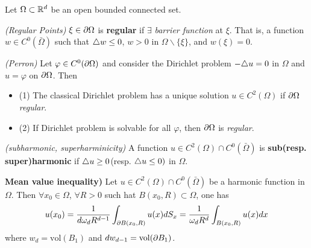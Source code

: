 \documentclass[12pt,a4paper]{article}
\renewenvironment{i}
{\begin{itemize} 
	}%
	{\end{itemize}
}
\begin{document}
Let $\Omega \subset \mathbb{R}^d$ be an open bounded connected set.
\s

 \emph{(Regular Points)} $\xi \in \partial \Omega$ is \textbf{regular} if $\exists$ \emph{barrier function} at $\xi$. That is, a function $w\in C^0 (\bar{\Omega})$ such that $\triangle w \leq 0$, $w>0$ in $\Omega \backslash \{\xi\}$, and $w(\xi)=0$.
\s

\thm \emph{(Perron)} Let $\varphi \in C^0 (\partial \Omega)$ and consider the Dirichlet problem $-\triangle u =0$ in $\Omega$ and $u=\varphi$ on $\partial \Omega$. Then
\begin{i}
\item[(1)] The classical Dirichlet problem has a unique solution $u\in C^2(\Omega)$ if $\partial \Omega$ \emph{regular}.
\item[(2)] If Dirichlet problem is solvable for all $\varphi$, then $\partial \Omega$ is \emph{regular}.
\end{i}
\s

 \emph{(subharmonic, superharminicity)} A function $u\in C^2(\Omega) \cap C^0(\bar{\Omega})$ is \textbf{sub(resp. super)harmonic} if $\triangle u\geq 0$(resp. $\triangle u \leq 0)$ in $\Omega$.
\s

\textbf{Mean value inequality)} Let $u\in C^2(\Omega) \cap C^0(\bar{\Omega})$ be a harmonic function in $\Omega$. Then $\forall x_0 \in \Omega$, $\forall R>0$ such hat $B(x_0, R) \subset \Omega$, one has
\begin{align*}
u(x_0) = \frac{1}{d\omega_d R^{d-1}} \int_{\partial B(x_0, R)} u(x) dS_x = \frac{1}{\omega_d R^d} \int_{B(x_0, R)} u(x)dx
\end{align*}
where $w_d = \text{vol}(B_1)$ and $dw_{d-1} = \text{vol}(\partial B_1)$.
\end{document}
